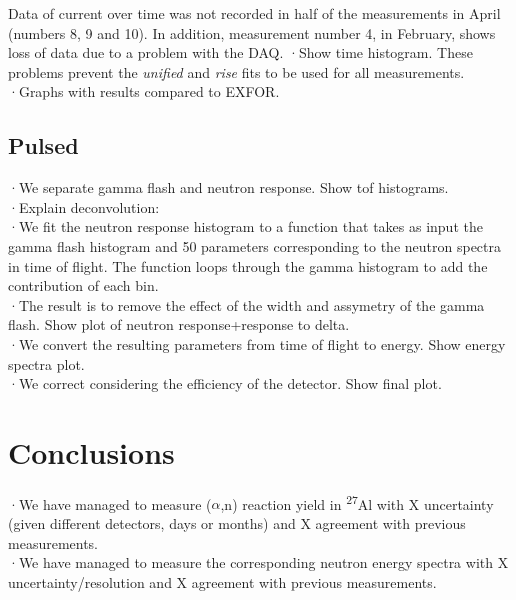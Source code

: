 \documentclass[a4paper,12pt]{report}
\newcommand{\an}{($\alpha$,n) }
\newcommand{\Aliso}{\textsuperscript{27}Al }
\begin{document}
Data of current over time was not recorded in half of the measurements in April (numbers 8, 9 and 10).	%
In addition, measurement number 4, in February, shows loss of data due to a problem with the DAQ. ·Show time histogram.
These problems prevent the \textit{unified} and \textit{rise} fits to be used for all measurements.
\\

·Graphs with results compared to EXFOR.\\

\section{Pulsed}
·We separate gamma flash and neutron response. Show tof histograms.\\
·Explain deconvolution:\\
·We fit the neutron response histogram to a function that takes as input the gamma flash histogram and 50 parameters corresponding to the neutron spectra in time of flight. The function loops through the gamma histogram to add the contribution of each bin.\\
·The result is to remove the effect of the width and assymetry of the gamma flash. Show plot of neutron response+response to delta.\\

·We convert the resulting parameters from time of flight to energy. Show energy spectra plot.\\
·We correct considering the efficiency of the detector. Show final plot.\\


\chapter{Conclusions}
·We have managed to measure \an reaction yield in \Aliso with X uncertainty (given different detectors, days or months) and X agreement with previous measurements.\\
·We have managed to measure the corresponding neutron energy spectra with X uncertainty/resolution and X agreement with previous measurements.\\
\end{document}
